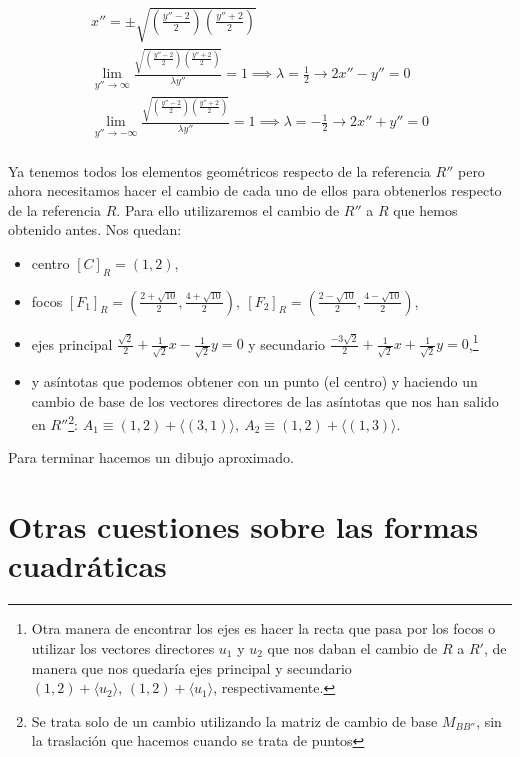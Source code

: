 \documentclass[14pt]{book}
\begin{document}
\begin{ej}
	\begin{align*}
		x'' = \pm\sqrt{\left(\frac{y'' - 2}{2}\right)\left(\frac{y'' + 2}{2}\right)} \\
		\lim_{y'' \to \infty} \frac{\sqrt{\left(\frac{y'' - 2}{2}\right)\left(\frac{y'' + 2}{2}\right)}}{\lambda y''} = 1 \implies \lambda = \frac{1}{2} \to 2x''  - y'' = 0 \\
		\lim_{y'' \to -\infty} \frac{\sqrt{\left(\frac{y'' - 2}{2}\right)\left(\frac{y'' + 2}{2}\right)}}{\lambda y''} = 1 \implies \lambda = -\frac{1}{2} \to 2x''  + y'' = 0 \\
	\end{align*}
	
	Ya tenemos todos los elementos geométricos respecto de la referencia $R''$ pero ahora necesitamos hacer el cambio de cada uno de ellos para obtenerlos respecto de la referencia $R$. Para ello utilizaremos el cambio de $R''$ a $R$ que hemos obtenido antes. Nos quedan:
	\begin{itemize}
		\item centro $[C]_R = (1, 2)$,
		\item focos $[F_1]_R = (\frac{2 + \sqrt{10}}{2}, \frac{4 + \sqrt{10}}{2}),\ [F_2]_R =  (\frac{2 - \sqrt{10}}{2}, \frac{4 - \sqrt{10}}{2})$,
		\item ejes principal $\frac{\sqrt{2}}{2} + \frac{1}{\sqrt{2}}x - \frac{1}{\sqrt{2}}y = 0$ y secundario $\frac{-3\sqrt{2}}{2} + \frac{1}{\sqrt{2}}x + \frac{1}{\sqrt{2}}y = 0$,\footnote{Otra manera de encontrar los ejes es hacer la recta que pasa por los focos o utilizar los vectores directores $u_1$ y $u_2$ que nos daban el cambio de $R$ a $R'$, de manera que nos quedaría ejes principal y secundario $(1,2) + \langle u_2 \rangle,\, (1, 2) + \langle u_1 \rangle$, respectivamente.}
		\item y asíntotas que podemos obtener con un punto (el centro) y haciendo un cambio de base de los vectores directores de las asíntotas que nos han salido en $R''$\footnote{Se trata solo de un cambio utilizando la matriz de cambio de base $M_{BB''}$, sin la traslación que hacemos cuando se trata de puntos}: $A_1 \equiv (1, 2) + \langle (3, 1) \rangle,\ A_2 \equiv (1, 2) + \langle (1, 3) \rangle$.
	\end{itemize}
	Para terminar hacemos un dibujo aproximado.
\end{ej}

\section{Otras cuestiones sobre las formas cuadráticas}
\end{document}
